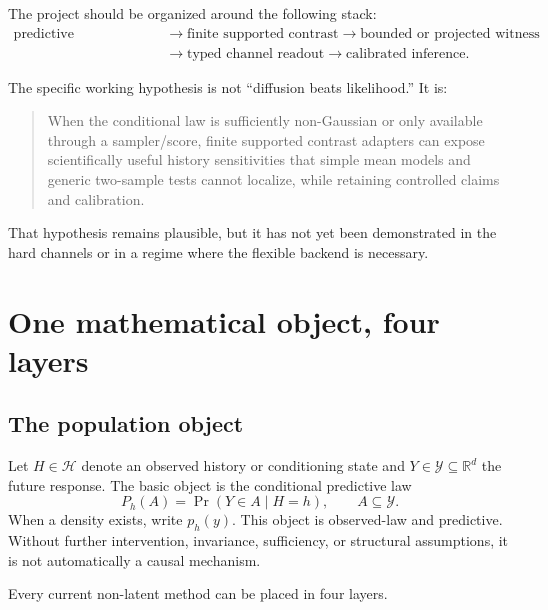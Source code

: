 \documentclass[10pt]{article}
\newcommand{\Ph}{P_h}
\newcommand{\R}{\mathbb{R}}
\begin{document}
The project should be organized around the following stack:
\[
\begin{aligned}
\text{predictive law/generator}
&\longrightarrow \text{finite supported contrast}
\longrightarrow \text{bounded or projected witness}\\
&\longrightarrow \text{typed channel readout}
\longrightarrow \text{calibrated inference}.
\end{aligned}
\]

The specific working hypothesis is not ``diffusion beats likelihood.'' It is:

\begin{quote}
When the conditional law is sufficiently non-Gaussian or only available through a sampler/score, finite supported contrast adapters can expose scientifically useful history sensitivities that simple mean models and generic two-sample tests cannot localize, while retaining controlled claims and calibration.
\end{quote}

That hypothesis remains plausible, but it has not yet been demonstrated in the hard channels or in a regime where the flexible backend is necessary.

\section{One mathematical object, four layers}

\subsection{The population object}

Let \(H\in\mathcal H\) denote an observed history or conditioning state and \(Y\in\mathcal Y\subseteq\R^d\) the future response. The basic object is the conditional predictive law
\[
  \Ph(A)=\Pr(Y\in A\mid H=h), \qquad A\subseteq\mathcal Y.
\]
When a density exists, write \(p_h(y)\). This object is observed-law and predictive. Without further intervention, invariance, sufficiency, or structural assumptions, it is not automatically a causal mechanism.

Every current non-latent method can be placed in four layers.
\end{document}
